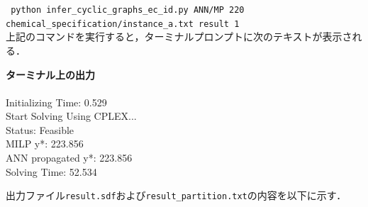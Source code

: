\documentclass[11pt, titlepage, dvipdfmx, twoside]{jarticle}
\begin{document}
{\tt 
 python infer\_cyclic\_graphs\_ec\_id.py 
ANN/MP
220 \\
 \phantom{python }
chemical\_specification/instance\_a.txt
result
1
 }\\


上記のコマンドを実行すると，ターミナルプロンプトに次のテキストが表示される．

\bigskip

\begin{oframed}
{\bf ターミナル上の出力}\\\\
 Initializing Time: 0.529  \\
Start Solving Using CPLEX...\\
Status: Feasible 		\\
MILP y*: 223.856 		\\
ANN propagated y*: 223.856 \\
Solving Time: 52.534       
\end{oframed}

出力ファイル{\tt result.sdf}および{\tt result\_partition.txt}の内容を以下に示す．

\bigskip
\end{document}
